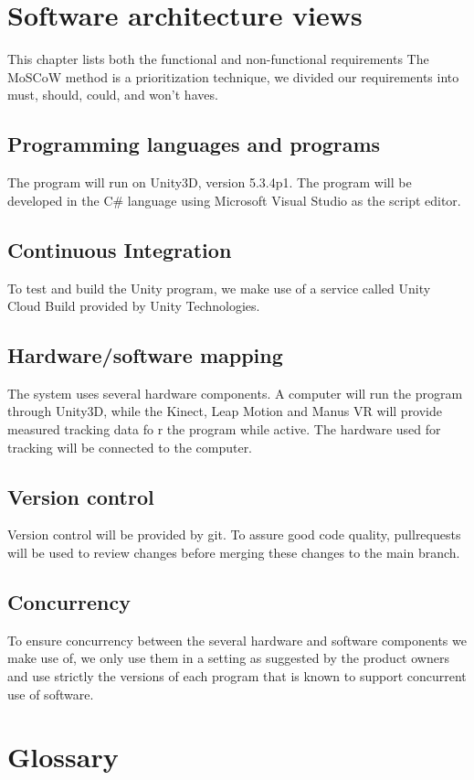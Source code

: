 \documentclass[11pt,a4paper]{report}
\begin{document}
\chapter{ Software architecture views}
This chapter lists both the functional and non-functional requirements
The MoSCoW method is a prioritization technique, we divided our requirements into must, should, could, and won't haves. 
\section{Programming languages and programs}
The program will run on Unity3D, version 5.3.4p1. The program will be developed in the C\#
language using Microsoft Visual Studio as the script editor.
\section{Continuous Integration}
To test and build the Unity program, we make use of a service called Unity Cloud Build
provided by Unity Technologies.
\section{Hardware/software mapping}
The system uses several hardware components. A computer will run the program through
Unity3D, while the Kinect, Leap Motion and Manus VR will provide measured tracking data
fo
r the program while active. The hardware used for tracking will be connected to the
computer.
\section{Version control}
Version control will be provided by git. To assure good code quality, pull­requests will be
used to review changes before merging these changes to the main branch.
\section{Concurrency}
To ensure concurrency between the several hardware and software components we make use
of, we only use them in a setting as suggested by the product owners and use strictly the
versions of each program that is known to support concurrent use of software.








\chapter{Glossary}
\end{document}
